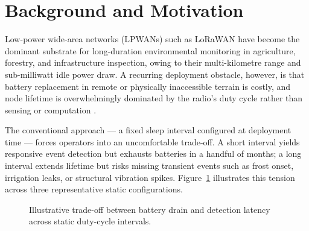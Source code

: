 \section{Background and Motivation}
Low-power wide-area networks (LPWANs) such as LoRaWAN have become the dominant substrate for
long-duration environmental monitoring in agriculture, forestry, and infrastructure
inspection, owing to their multi-kilometre range and sub-milliwatt idle power draw. A recurring
deployment obstacle, however, is that battery replacement in remote or physically inaccessible
terrain is costly, and node lifetime is overwhelmingly dominated by the radio's duty cycle
rather than sensing or computation \cite{bor2016lora}.

The conventional approach --- a fixed sleep interval configured at deployment time --- forces
operators into an uncomfortable trade-off. A short interval yields responsive event detection
but exhausts batteries in a handful of months; a long interval extends lifetime but risks
missing transient events such as frost onset, irrigation leaks, or structural vibration
spikes. Figure~\ref{fig:tradeoff} illustrates this tension across three representative static
configurations.

\begin{figure}[H]
\centering
{}
\caption{Illustrative trade-off between battery drain and detection latency across static duty-cycle intervals.}
\label{fig:tradeoff}
\end{figure}

